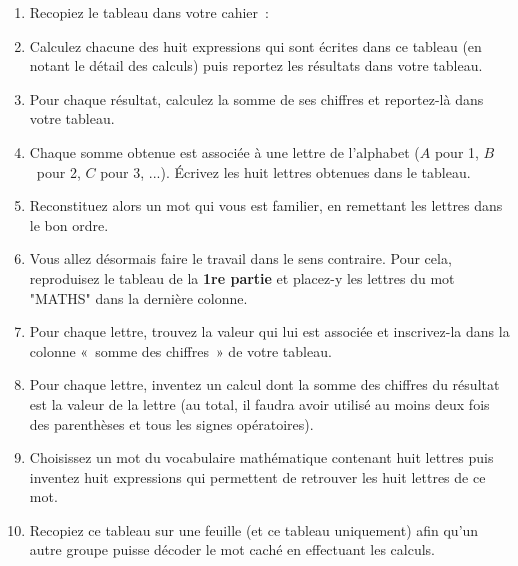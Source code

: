 
\begin{TP}


\begin{enumerate}
 \item Recopiez le tableau dans votre cahier :
 \item Calculez chacune des huit expressions qui sont écrites dans ce tableau (en notant le détail des calculs) puis reportez les résultats dans votre tableau.
 \item Pour chaque résultat, calculez la somme de ses chiffres et reportez-là dans votre tableau.
 \item Chaque somme obtenue est associée à une lettre de l'alphabet ($A$ pour 1, $B$ pour 2, $C$ pour 3, ...). Écrivez les huit lettres obtenues dans le tableau.
 \item Reconstituez alors un mot qui vous est familier, en remettant les lettres dans le bon ordre.


 \item Vous allez désormais faire le travail dans le sens contraire. Pour cela, reproduisez le tableau de la \textbf{1re partie} et placez-y les lettres du mot "MATHS" dans la dernière colonne.
 \item Pour chaque lettre, trouvez la valeur qui lui est associée et inscrivez-la dans la colonne « somme des chiffres » de votre tableau.
 \item Pour chaque lettre, inventez un calcul dont la somme des chiffres du résultat est la valeur de la lettre (au total, il faudra avoir utilisé au moins deux fois des parenthèses et tous les signes opératoires).


 \item Choisissez un mot du vocabulaire mathématique contenant huit lettres puis inventez huit expressions qui permettent de retrouver les huit lettres de ce mot.
 \item Recopiez ce tableau sur une feuille (et ce tableau uniquement) afin qu'un autre groupe puisse décoder le mot caché en effectuant les calculs.
 
 \end{enumerate}

\end{TP}


